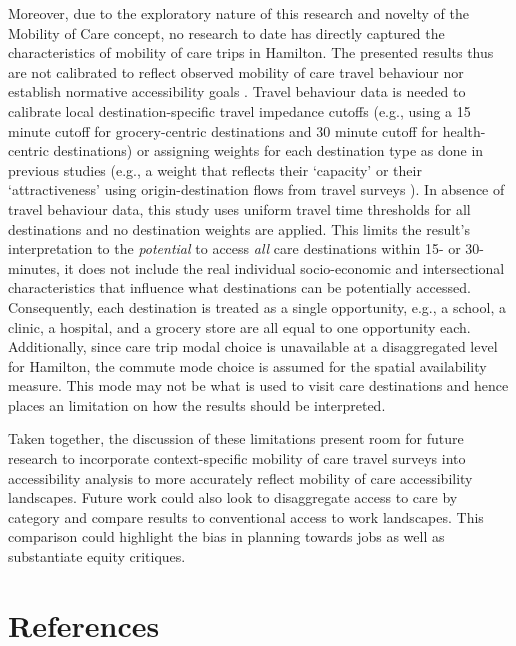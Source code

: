 \documentclass[
  authoryear,
  preprint,
  3p]{elsarticle}
\begin{document}
Moreover, due to the exploratory nature of this research and novelty of
the Mobility of Care concept, no research to date has directly captured
the characteristics of mobility of care trips in Hamilton. The presented
results thus are not calibrated to reflect observed mobility of care
travel behaviour nor establish normative accessibility goals
\citep{paezMeasuringAccessibilityPositive2012}. Travel behaviour data is
needed to calibrate local destination-specific travel impedance cutoffs
(e.g., using a 15 minute cutoff for grocery-centric destinations and 30
minute cutoff for health-centric destinations) or assigning weights for
each destination type as done in previous studies (e.g., a weight that
reflects their `capacity' \citep{liMeasuringMultiactivities2024} or
their `attractiveness' using origin-destination flows from travel
surveys
\citep{graellsCityCitiesMeasuring2021, chengInvestigatingWalkingAccessibility2019}).
In absence of travel behaviour data, this study uses uniform travel time
thresholds for all destinations and no destination weights are applied.
This limits the result's interpretation to the \emph{potential} to
access \emph{all} care destinations within 15- or 30- minutes, it does
not include the real individual socio-economic and intersectional
characteristics that influence what destinations can be potentially
accessed. Consequently, each destination is treated as a single
opportunity, e.g., a school, a clinic, a hospital, and a grocery store
are all equal to one opportunity each. Additionally, since care trip
modal choice is unavailable at a disaggregated level for Hamilton, the
commute mode choice is assumed for the spatial availability measure.
This mode may not be what is used to visit care destinations and hence
places an limitation on how the results should be interpreted.

Taken together, the discussion of these limitations present room for
future research to incorporate context-specific mobility of care travel
surveys into accessibility analysis to more accurately reflect mobility
of care accessibility landscapes. Future work could also look to
disaggregate access to care by category and compare results to
conventional access to work landscapes. This comparison could highlight
the bias in planning towards jobs as well as substantiate equity
critiques.

\section{References}\label{references}


  
\end{document}
